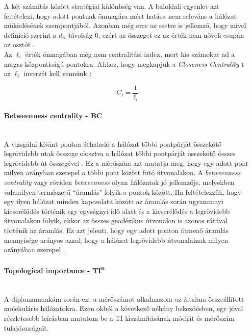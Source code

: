 \documentclass[a4paper,12pt]{article}
\begin{document}
	 A két számítás között stratégiai különbség van. A baloldali egyenlet azt feltételezi, hogy adott pontnak önmagára mért hatása nem releváns a hálózat működésének szempontjából. Azonban még erre az esetre is jellemző, hogy mivel definíció szerint a $d_{ii}$ távolság 0, ezért az összeget ez az érték nem növeli csupán az osztót \cite{newman_networks}.  \\
	 Az $\ell_i$ érték önmagában még nem centralitási index, mert kis számokat ad a magas központiságú pontokra. Ahhoz, hogy megkapjuk a \textit{Closeness Centrality}-t az $\ell_i$ inverzét kell vennünk \cite{newman_networks}:
	 
	 	\begin{equation}
			C_i = \frac{1}{\ell_i}
	 	\end{equation}
	 
	 \paragraph{Betweenness centrality - BC} \mbox{}\\ 
	 A vizsgálni kívánt ponton áthaladó a hálózat többi pontpárját összekötő legrövidebb utak összege elosztva a hálózat többi pontpárját összekötő összes legrövidebb út összegével \cite{top_indexes}. 	 Ez a mérőszám azt mutatja meg, hogy egy adott pont milyen arányban szerepel a többi pont között futó útvonalakon. A \textit{betweenness centrality} vagy röviden  \textit{betweenness} olyan hálózatok jó jellemzője, melyekben valamilyen természetű ``áramlás" folyik a pontok között. Ha feltételezzük, hogy egy ilyen hálózat minden kapcsolata között az áramlás során ugyanannyi kicserélődés történik egy egységnyi idő alatt és a kicserélődés a legrövidebb útvonalakon folyik, akkor az összes geodézikus útvonalon is azonos rátával történik az áramlás. Ez azt jelenti, hogy egy adott ponton átmenő áramlás mennyisége arányos azzal, hogy a hálózat legrövidebb útvonalainak milyen arányában szerepel \cite{newman_networks}.
	 
	 \paragraph{Topological importance - TI\textsuperscript{n}}  \mbox{}\\
	 A diplomamunkám során ezt a mérőszámot alkalmazom az általam összeállított molekuláris hálózatokra. Ezen okból a következő néhány bekezdésben, egy jóval részletesebb leírásban mutatom be a TI kiszámításának módját és mérőszám tulajdonságait. 
	 
\end{document}
